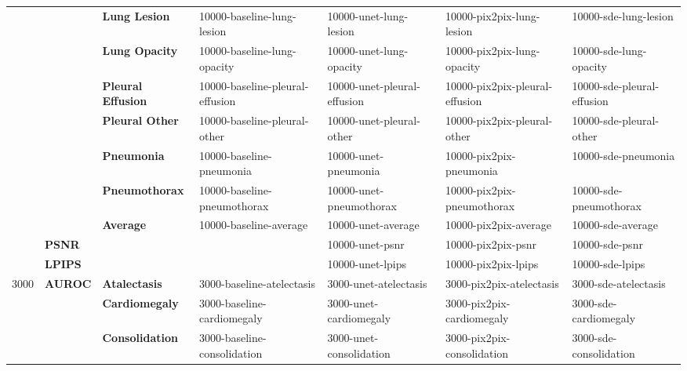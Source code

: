 \begin{table}[]
\begin{tabular}{cll|llll}
                                 &                        & \textbf{Lung Lesion} & 10000-baseline-lung-lesion & 10000-unet-lung-lesion & 10000-pix2pix-lung-lesion & 10000-sde-lung-lesion \\ 
                                 &                        & \textbf{Lung Opacity} & 10000-baseline-lung-opacity & 10000-unet-lung-opacity & 10000-pix2pix-lung-opacity & 10000-sde-lung-opacity \\ 
                                 &                        & \textbf{Pleural Effusion} & 10000-baseline-pleural-effusion & 10000-unet-pleural-effusion & 10000-pix2pix-pleural-effusion & 10000-sde-pleural-effusion \\ 
                                 &                        & \textbf{Pleural Other} & 10000-baseline-pleural-other & 10000-unet-pleural-other & 10000-pix2pix-pleural-other & 10000-sde-pleural-other \\ 
                                 &                        & \textbf{Pneumonia} & 10000-baseline-pneumonia & 10000-unet-pneumonia & 10000-pix2pix-pneumonia & 10000-sde-pneumonia \\ 
                                 &                        & \textbf{Pneumothorax} & 10000-baseline-pneumothorax & 10000-unet-pneumothorax & 10000-pix2pix-pneumothorax & 10000-sde-pneumothorax \\
                                 &                        & \textbf{Average} & 10000-baseline-average & 10000-unet-average & 10000-pix2pix-average & 10000-sde-average \\ \cline{2-3}
                                 & \multicolumn{2}{l|}{\textbf{PSNR}}            & \cellcolor[HTML]{C0C0C0} & 10000-unet-psnr & 10000-pix2pix-psnr & 10000-sde-psnr \\
                                 & \multicolumn{2}{l|}{\textbf{LPIPS}}           & \cellcolor[HTML]{C0C0C0} & 10000-unet-lpips & 10000-pix2pix-lpips & 10000-sde-lpips \\ \hline
\multirow{15}{*}{3000}               & \multirow{13}{*}{\textbf{AUROC}} & \textbf{Atalectasis}  & 3000-baseline-atelectasis & 3000-unet-atelectasis & 3000-pix2pix-atelectasis & 3000-sde-atelectasis \\
                                 &                        & \textbf{Cardiomegaly} & 3000-baseline-cardiomegaly & 3000-unet-cardiomegaly & 3000-pix2pix-cardiomegaly & 3000-sde-cardiomegaly \\
                                 &                        & \textbf{Consolidation} & 3000-baseline-consolidation & 3000-unet-consolidation & 3000-pix2pix-consolidation & 3000-sde-consolidation \\ 

\end{tabular}
\end{table}
